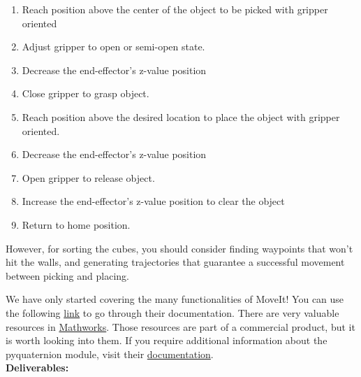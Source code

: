\documentclass[12pt]{article}
\begin{document}
\begin{enumerate}
    \item Reach position above the center of the object to be picked with gripper oriented
    \item Adjust gripper to open or semi-open state.
    \item Decrease the end-effector’s z-value position
    \item Close gripper to grasp object.
    \item Reach position above the desired location to place the object with gripper oriented.
    \item Decrease the end-effector’s z-value position
    \item Open gripper to release object.
    \item Increase the end-effector’s z-value position to clear the object
    \item Return to home position.
    
\end{enumerate}

However, for sorting the cubes, you should consider finding waypoints that won't hit the walls, and generating trajectories that guarantee a successful movement between picking and placing.


We have only started covering the many functionalities of MoveIt! You can use the following \hyperlink{http://docs.ros.org/en/melodic/api/moveit_tutorials/html/doc/quickstart_in_rviz/quickstart_in_rviz_tutorial.html}{link} to go through their documentation.
There are very valuable resources in \hyperlink{https://www.mathworks.com/videos/trajectory-planning-for-robot-manipulators-1556705635398.html}{Mathworks}. Those resources are part of a commercial product, but it is worth looking into them.
If you require additional information about the pyquaternion module, visit their \hyperlink{http://kieranwynn.github.io/pyquaternion/}{documentation}.\\

\textbf{Deliverables:}
\end{document}
